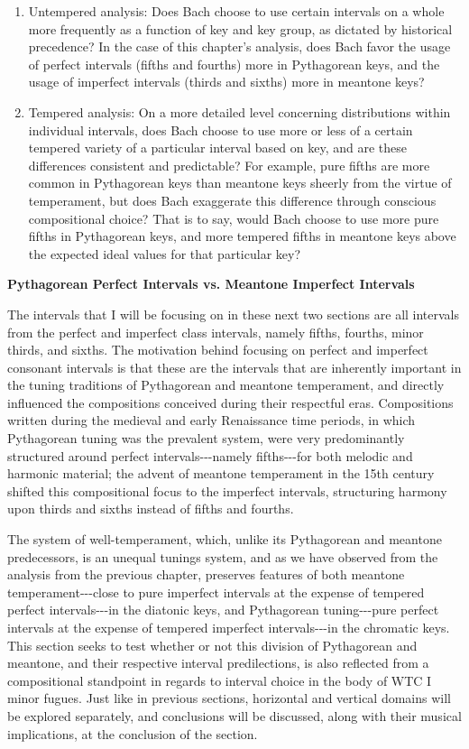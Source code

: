 \begin{enumerate}
\def\labelenumi{\arabic{enumi}.}
\tightlist
\item
  Untempered analysis: Does Bach choose to use certain intervals on a
  whole more frequently as a function of key and key group, as dictated
  by historical precedence? In the case of this chapter's analysis, does
  Bach favor the usage of perfect intervals (fifths and fourths) more in
  Pythagorean keys, and the usage of imperfect intervals (thirds and
  sixths) more in meantone keys?
\item
  Tempered analysis: On a more detailed level concerning distributions
  within individual intervals, does Bach choose to use more or less of a
  certain tempered variety of a particular interval based on key, and
  are these differences consistent and predictable? For example, pure
  fifths are more common in Pythagorean keys than meantone keys sheerly
  from the virtue of temperament, but does Bach exaggerate this
  difference through conscious compositional choice? That is to say,
  would Bach choose to use more pure fifths in Pythagorean keys, and
  more tempered fifths in meantone keys above the expected ideal values
  for that particular key?
\end{enumerate}

\textbf{Pythagorean Perfect Intervals vs. Meantone Imperfect Intervals}

The intervals that I will be focusing on in these next two sections are
all intervals from the perfect and imperfect class intervals, namely
fifths, fourths, minor thirds, and sixths. The motivation behind
focusing on perfect and imperfect consonant intervals is that these are
the intervals that are inherently important in the tuning traditions of
Pythagorean and meantone temperament, and directly influenced the
compositions conceived during their respectful eras. Compositions
written during the medieval and early Renaissance time periods, in which
Pythagorean tuning was the prevalent system, were very predominantly
structured around perfect intervals-\/-\/-namely fifths-\/-\/-for both
melodic and harmonic material; the advent of meantone temperament in the
15th century shifted this compositional focus to the imperfect
intervals, structuring harmony upon thirds and sixths instead of fifths
and fourths.

The system of well-temperament, which, unlike its Pythagorean and
meantone predecessors, is an unequal tunings system, and as we have
observed from the analysis from the previous chapter, preserves features
of both meantone temperament-\/-\/-close to pure imperfect intervals at
the expense of tempered perfect intervals-\/-\/-in the diatonic keys,
and Pythagorean tuning-\/-\/-pure perfect intervals at the expense of
tempered imperfect intervals-\/-\/-in the chromatic keys. This section
seeks to test whether or not this division of Pythagorean and meantone,
and their respective interval predilections, is also reflected from a
compositional standpoint in regards to interval choice in the body of
WTC I minor fugues. Just like in previous sections, horizontal and
vertical domains will be explored separately, and conclusions will be
discussed, along with their musical implications, at the conclusion of
the section.

